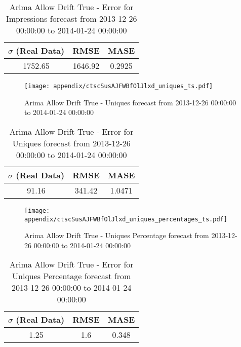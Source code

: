 \begin{table}[H]
\centering
\footnotesize
\begin{tabular}{ccc}
$\sigma$ (Real Data) & RMSE & MASE   \\ \hline
1752.65 & 1646.92 & 0.2925 \\
\end{tabular}

\vspace{0.5cm}

\caption{
Arima Allow Drift True - Error for Impressions forecast from 2013-12-26 00:00:00 to 2014-01-24 00:00:00}
\end{table}

\begin{figure}[H] \begin{center} \leavevmode
\texttt{[image: appendix/ctscSusAJFWBfOlJlxd\_uniques\_ts.pdf]} \caption{
Arima Allow Drift True - Uniques forecast from 2013-12-26 00:00:00 to 2014-01-24 00:00:00} \label{fig:appendix/ctscSusAJFWBfOlJlxd_uniques_ts.pdf} \end{center}
\end{figure}

\begin{table}[H]
\centering
\footnotesize
\begin{tabular}{ccc}
$\sigma$ (Real Data) & RMSE & MASE   \\ \hline
91.16 & 341.42 & 1.0471 \\
\end{tabular}

\vspace{0.5cm}

\caption{
Arima Allow Drift True - Error for Uniques forecast from 2013-12-26 00:00:00 to 2014-01-24 00:00:00}
\end{table}

\begin{figure}[H] \begin{center} \leavevmode
\texttt{[image: appendix/ctscSusAJFWBfOlJlxd\_uniques\_percentages\_ts.pdf]} \caption{
Arima Allow Drift True - Uniques Percentage forecast from 2013-12-26 00:00:00 to 2014-01-24 00:00:00} \label{fig:appendix/ctscSusAJFWBfOlJlxd_uniques_percentages_ts.pdf} \end{center}
\end{figure}

\begin{table}[H]
\centering
\footnotesize
\begin{tabular}{ccc}
$\sigma$ (Real Data) & RMSE & MASE   \\ \hline
1.25 & 1.6 & 0.348 \\
\end{tabular}

\vspace{0.5cm}

\caption{
Arima Allow Drift True - Error for Uniques Percentage forecast from 2013-12-26 00:00:00 to 2014-01-24 00:00:00}
\end{table}

